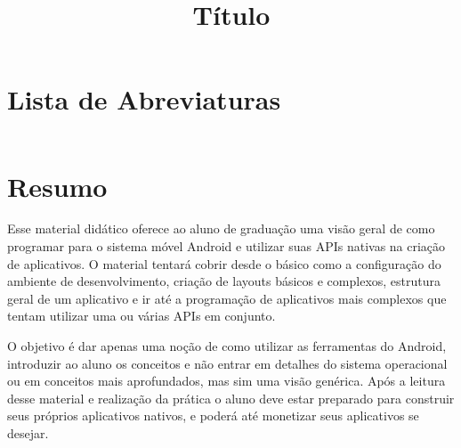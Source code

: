 \documentclass[a4paper,12pt,brazil,doubleside]{book}
\title{Título}
\begin{document}


\pagestyle{empty}

\cleardoublepage

\onehalfspace

\pagestyle{plain}

\setcounter{tocdepth}{1} %
\tableofcontents
\clearpage %
\thispagestyle{empty}

\listoffigures
{}
\clearpage %
\thispagestyle{empty}

\listoftables
{}
\clearpage %
\thispagestyle{empty}

\lstlistoflistings
{}
\clearpage %
\thispagestyle{empty}

\chapter*{Lista de Abreviaturas}
\begin{longtable}{ll}
\end{longtable}

\renewcommand\lstlistingname{Algorithm}
\renewcommand\lstlistlistingname{Algorithms}

\chapter*{Resumo}

\begin{singlespace}
Esse material didático oferece ao aluno de graduação uma visão geral de como programar para o sistema móvel Android e utilizar suas APIs nativas na criação de aplicativos. O material tentará cobrir desde o básico como a configuração do ambiente de desenvolvimento, criação de layouts básicos e complexos, estrutura geral de um aplicativo e ir até a programação de aplicativos mais complexos que tentam utilizar uma ou várias APIs em conjunto.

O objetivo é dar apenas uma noção de como utilizar as ferramentas do Android, introduzir ao aluno os conceitos e não entrar em detalhes do sistema operacional ou em conceitos mais aprofundados, mas sim uma visão genérica.
Após a leitura desse material e realização da prática o aluno deve estar preparado para construir seus próprios aplicativos nativos, e poderá até monetizar seus aplicativos se desejar.
\end{singlespace}
\end{document}
